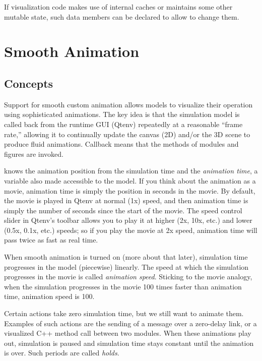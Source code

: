 If visualization code makes use of internal caches or maintains some
other mutable state, such data members can be declared 
to allow  to change them.


\section{Smooth Animation}
\label{sec:graphics:smooth-animation}

\subsection{Concepts}
\label{sec:graphics:animation-concepts}

Support for smooth custom animation allows models to visualize their operation
using sophisticated animations. The key idea is that the simulation model
is called back from the runtime GUI (Qtenv) repeatedly at a reasonable
``frame rate,'' allowing it to continually update the canvas (2D) and/or the
3D scene to produce fluid animations. Callback means that the
 methods of modules and figures are invoked.

 knows the animation position from the simulation time
and the \textit{animation time}, a variable also made accessible to the model.
If you think about the animation as a movie, animation time is simply the
position in seconds in the movie. By default, the movie is played in Qtenv at normal (1x)
speed, and then animation time is simply the number of seconds since the
start of the movie. The speed control slider in Qtenv's toolbar allows
you to play it at higher (2x, 10x, etc.) and lower (0.5x, 0.1x, etc.)
speeds; so if you play the movie at 2x speed, animation time will
pass twice as fast as real time.

When smooth animation is turned on (more about that later), simulation
time progresses in the model (piecewise) linearly. The speed at which the simulation
progresses in the movie is called \textit{animation speed}. Sticking to the
movie analogy, when the simulation progresses in the movie 100 times
faster than animation time, animation speed is 100.

Certain actions take zero simulation time, but we still want to animate
them. Examples of such actions are the sending of a message over a zero-delay link,
or a visualized C++ method call between two modules. When these animations play
out, simulation is paused and simulation time stays constant
until the animation is over. Such periods are called \textit{holds}.

